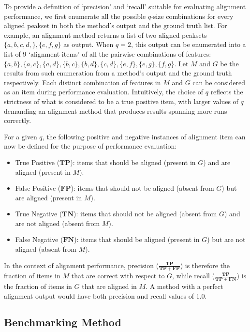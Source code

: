 To provide a definition of `precision' and `recall' suitable for evaluating alignment performance, we first enumerate all the possible $q$-size combinations for every aligned peakset in both the method's output and the ground truth list. For example, an alignment method returns a list of two aligned peaksets $\{a,b,c,d,\},\allowbreak\{e,f,g\}$ as output. When $q=2$, this output can be enumerated into a list of 9 `alignment items' of all the pairwise combinations of features: $\{a,b\},\allowbreak\{a,c\},\allowbreak\{a,d\},\allowbreak\{b,c\},\allowbreak\{b,d\},\allowbreak\{c,d\},\allowbreak\{e,f\},\allowbreak\{e,g\},\allowbreak\{f,g\}$. Let $M$ and $G$ be the results from such enumeration from a method's output and the ground truth respectively. Each distinct combination of features in $M$ and $G$ can be considered as an item during performance evaluation. Intuitively, the choice of $q$ reflects the strictness of what is considered to be a true positive item, with larger values of $q$ demanding an alignment method that produces results spanning more runs correctly. 

For a given $q$, the following positive and negative instances of alignment item can now be defined for the purpose of performance evaluation:

\begin{itemize}
\item True Positive ($\boldsymbol{TP}$): items that should be aligned (present in $G$) and are aligned (present in $M$).
\item False Positive ($\boldsymbol{FP}$): items that should not be aligned (absent from $G$) but are aligned (present in $M$).
\item True Negative ($\boldsymbol{TN}$): items that should not be aligned (absent from $G$) and are not aligned (absent from $M$).
\item False Negative ($\boldsymbol{FN}$): items that should be aligned (present in $G$) but are not aligned (absent from $M$).
\end{itemize}

In the context of alignment performance, precision ($\frac{\boldsymbol{TP}}{\boldsymbol{TP}+\boldsymbol{FP}}$) is therefore the fraction of items in $M$ that are correct with respect to $G$, while recall ($\frac{\boldsymbol{TP}}{\boldsymbol{TP}+\boldsymbol{FN}}$) is the fraction of items in $G$ that are aligned in $M$. A method with a perfect alignment output would have both precision and recall values of 1.0. 

\subsection{Benchmarking Method}

